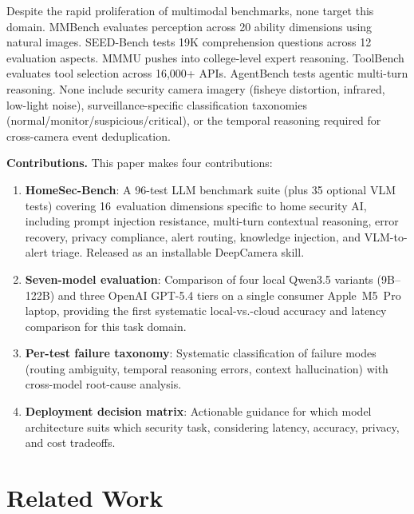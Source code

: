 \documentclass[onecolumn,10pt]{IEEEtran}
\begin{document}
Despite the rapid proliferation of multimodal benchmarks, none target
this domain. MMBench \cite{liu2023mmbench} evaluates perception across
20 ability dimensions using natural images. SEED-Bench
\cite{li2023seedbench} tests 19K comprehension questions across 12
evaluation aspects. MMMU \cite{yue2024mmmu} pushes into
college-level expert reasoning. ToolBench \cite{qin2023toolllm} evaluates
tool selection across 16,000+ APIs. AgentBench \cite{liu2023agentbench}
tests agentic multi-turn reasoning. None include security camera imagery
(fisheye distortion, infrared, low-light noise), surveillance-specific
classification taxonomies (normal/monitor/suspicious/critical), or the
temporal reasoning required for cross-camera event deduplication.

\textbf{Contributions.} This paper makes four contributions:
\begin{enumerate}[nosep]
    \item \textbf{HomeSec-Bench}: A 96-test LLM benchmark suite (plus
    35 optional VLM tests) covering 16~evaluation dimensions specific
    to home security AI, including prompt injection resistance,
    multi-turn contextual reasoning, error recovery, privacy
    compliance, alert routing, knowledge injection, and VLM-to-alert
    triage. Released as an installable DeepCamera skill.
    \item \textbf{Seven-model evaluation}: Comparison of four local
    Qwen3.5 variants (9B--122B) and three OpenAI GPT-5.4 tiers on
    a single consumer Apple~M5~Pro laptop, providing the first
    systematic local-vs.-cloud accuracy and latency comparison for
    this task domain.
    \item \textbf{Per-test failure taxonomy}: Systematic classification
    of failure modes (routing ambiguity, temporal reasoning errors,
    context hallucination) with cross-model root-cause analysis.
    \item \textbf{Deployment decision matrix}: Actionable guidance for
    which model architecture suits which security task, considering
    latency, accuracy, privacy, and cost tradeoffs.
\end{enumerate}


\section{Related Work}
\end{document}
